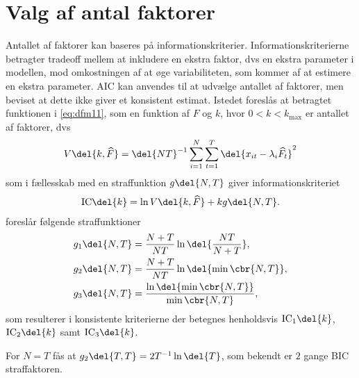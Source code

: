 \section{Valg af antal faktorer}
%
Antallet af faktorer kan baseres på informationskriterier.
Informationskriterierne betragter tradeoff mellem at inkludere en ekstra faktor, dvs en ekstra parameter i modellen, mod omkostningen af at øge variabiliteten, som kommer af at estimere en ekstra parameter.
AIC kan anvendes til at udvælge antallet af faktorer, men \citep{Bai_Ng} beviset at dette ikke giver et konsistent estimat.
Istedet foreslås at betragtet funktionen i \eqref{eq:dfm11}, som en funktion af \(F\) og \(k\), hvor \(0<k<k_\text{max}\) er antallet af faktorer, dvs
\begin{align*}
V \del{k, \widehat{F}} = \del{NT}^{-1} \sum_{i=1}^N \sum_{t=1}^T \del{x_{it} -\lambda_i \widehat{F_t}}^2
\end{align*}
som i fællesskab med en straffunktion \(g \del{N,T}\) giver informationskriteriet
\begin{align*}
\text{IC} \del{k} = \ln V \del{k, \widehat{F}} + k g \del{N,T}.
\end{align*}
\citep{Bai_Ng} foreslår følgende straffunktioner
\begin{align*}
g_1 \del{N,T} &= \frac{N + T}{N T} \ln \del{\frac{NT}{N + T}}, \\
g_2 \del{N,T} &= \frac{N + T}{N T} \ln \del{ \min \cbr{N, T}}, \\
g_3 \del{N,T} &= \frac{\ln \del{\min \cbr{N, T}}}{\min \cbr{N, T}},
\end{align*}
som resulterer i konsistente kriterierne der betegnes henholdsvis \(\text{IC}_1 \del{k}\), \(\text{IC}_2 \del{k}\) samt \(\text{IC}_3 \del{k}\).

For \(N = T\) fås at \(g_2 \del{T,T} = 2T^{-1} \ln \del{T}\), som bekendt er \(2\) gange BIC straffaktoren.
%
